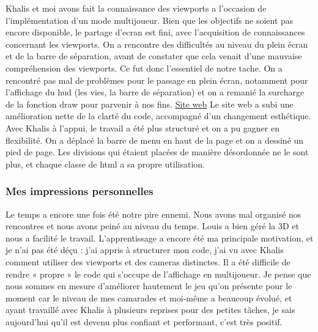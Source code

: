 \documentclass{article}
\begin{document}
\par
Khalis et moi avons fait la connaissance des viewports a l’occasion de l’implémentation d’un mode multijoueur. Bien que les objectifs ne soient pas encore disponible, le partage d’ecran est fini, avec l’acquisition de connaissances concernant les viewports. On a rencontre des difficultés au niveau du plein écran et de la barre de séparation, avant de constater que cela venait d’une mauvaise compréhension des viewports. Ce fut donc l’essentiel de notre tache. On a rencontré pas mal de problèmes pour le passage en plein écran, notamment pour l’affichage du hud (les vies, la barre de séparation) et on a remanié la surcharge de la fonction draw pour parvenir à nos fins.
\newline
\underline{Site web}
Le site web a subi une amélioration nette de la clarté du code, accompagné d’un changement esthétique. Avec Khalis à l’appui, le travail a été plus structuré et on a pu gagner en flexibilité. On a déplacé la barre de menu en haut de la page et on a dessiné un pied de page. Les divisions qui étaient placées de manière désordonnée ne le sont plus, et chaque classe de html a sa propre utilisation.
\newpage

\subsubsection {Mes impressions personnelles}
\par
Le temps a encore une fois été notre pire ennemi. Nous avons mal organisé nos rencontres et nous avons peiné au niveau du temps. Louis a bien géré la 3D et nous a facilité le travail. L’apprentissage a encore été ma principale motivation, et je n’ai pas été déçu : j’ai appris à structurer mon code, j’ai vu avec Khalis comment utiliser des viewports et des cameras distinctes. Il a été difficile de rendre « propre » le code qui s’occupe de l’affichage en multijoueur. Je pense que nous sommes en mesure d’améliorer hautement le jeu qu’on présente pour le moment car le niveau de mes camarades et moi-même a beaucoup évolué, et ayant travaillé avec Khalis à plusieurs reprises pour des petites tâches, je sais aujourd’hui qu’il est devenu plus confiant et performant, c’est très positif.
\newline
\end{document}
